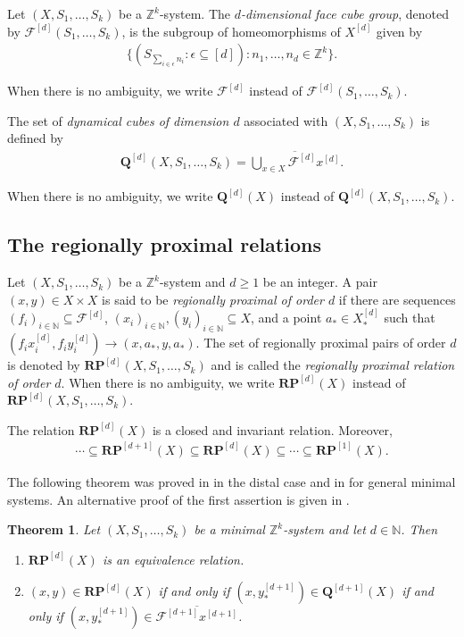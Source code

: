 \documentclass[11pt,reqno]{amsart}
\newcommand{\Z}{\mathbb{Z}}
\newcommand{\N}{\mathbb{N}}
\newcommand{\RP}{\mathbf{RP}}
\newcommand{\bQ}{\bm{Q}}
\newcommand{\cF}{{\mathcal F}}
\newtheorem{theorem}{Theorem}[section]
\theoremstyle{definition}
\theoremstyle{remark}
\begin{document}
Let $(X,S_1,\dots,S_k)$ be a $\Z^k$-system. The {\em $d$-dimensional face cube group}, denoted by $\cF^{[d]}(S_1,\dots,S_k)$, is the subgroup of homeomorphisms of $X^{[d]}$ given by \begin{align*}
    \{(S_{\sum_{i\in \epsilon} n_i}: \epsilon\subseteq[d]): n_1,\dots,n_d\in \Z^{k}\}.
\end{align*}

When there is no ambiguity, we write $\cF^{[d]}$ instead of $\cF^{[d]}(S_1,\dots,S_k)$.

The set of {\em dynamical cubes of dimension $d$} associated with $(X,S_1,\dots,S_k)$ is defined by \begin{align*}
    \bQ^{[d]}(X,S_1,\dots,S_k) = \overline{\bigcup_{x\in X} \cF^{[d]}x^{[d]}}.
\end{align*}

When there is no ambiguity, we write $\bQ^{[d]}(X)$ instead of $\bQ^{[d]}(X,S_1,\dots,S_k)$.

\subsection{The regionally proximal relations}
Let $(X, S_1,\dots,S_k)$ be a $\Z^k$-system and $d\geq 1$ be an integer. A pair $(x,y)\in X\times X$ is said to be {\em regionally proximal of order $d$} if there are sequences $(f_{i})_{i\in\N}\subseteq \cF^{[d]}$, $(x_{i})_{i\in\N},(y_{i})_{i\in\N}\subseteq X$, and a point $a_{*}\in X^{[d]}_{*}$ such that $(f_{i}x^{[d]}_{i},f_{i}y_{i}^{[d]})\to (x,a_{*},y,a_{*})$. The set of regionally proximal pairs of order $d$ is denoted by $\RP^{[d]}(X,S_1,\dots,S_k)$ and is called the {\em regionally proximal relation of order $d$}. When there is no ambiguity, we write $\RP^{[d]}(X)$ instead of $\RP^{[d]}(X,S_1,\dots,S_k)$.

The relation $\RP^{[d]}(X)$ is a closed and invariant relation. Moreover,\begin{align*}
     \cdots \subseteq \RP^{[d+1]}(X)\subseteq \RP^{[d]}(X)\subseteq \cdots \subseteq \RP^{[1]}(X). 
\end{align*}

The following theorem was proved in \cite{Host_Kra_Maass_nilstructure:2010} in the distal case and in \cite{Shao_Ye_regionally_prox_orderd:2012} for general minimal systems. An alternative proof of the first assertion is given in \cite{Alvarez_Donoso_cube_struct_univ_nil_applications:2025}.

\begin{theorem}
    Let $(X,S_1,\dots,S_k)$ be a minimal $\Z^{k}$-system and let $d\in\N$. Then\begin{enumerate}
        \item $\RP^{[d]}(X)$ is an equivalence relation.
        \item $(x,y)\in \RP^{[d]}(X)$ if and only if $(x,y^{[d+1]}_*)\in \bQ^{[d+1]}(X)$ if and only if $(x,y^{[d+1]}_*)\in \overline{\cF^{[d+1]}x^{[d+1]}}$.
    \end{enumerate} 
\end{theorem}
\end{document}

